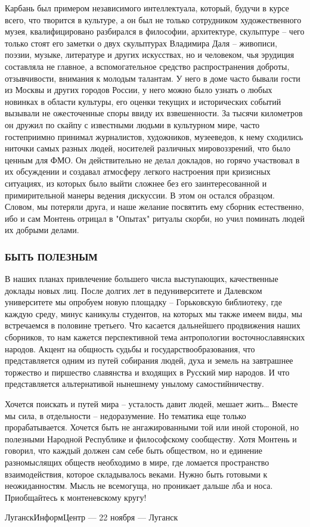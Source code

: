 Карбань был примером независимого интеллектуала, который, будучи в курсе всего,
что творится в культуре, а он был не только сотрудником художественного музея,
квалифицировано разбирался в философии, архитектуре, скульптуре – чего только
стоят его заметки о двух скульптурах Владимира Даля – живописи, поэзии, музыке,
литературе и других искусствах, но и человеком, чья эрудиция составляла не
главное, а вспомогательное средство распространения доброты, отзывчивости,
внимания к молодым талантам. У него в доме часто бывали гости из Москвы и
других городов России, у него можно было узнать о любых новинках в области
культуры, его оценки текущих и исторических событий вызывали не ожесточенные
споры ввиду их взвешенности. За тысячи километров он дружил по скайпу с
известными людьми в культурном мире, часто гостеприимно принимал журналистов,
художников, музееведов, к нему сходились ниточки самых разных людей, носителей
различных мировоззрений, что было ценным для ФМО. Он действительно не делал
докладов, но горячо участвовал в их обсуждении и создавал атмосферу легкого
настроения при кризисных ситуациях, из которых было выйти сложнее без его
заинтересованной и примирительной манеры ведения дискуссии. В этом он остался
образцом. Словом, мы потеряли друга, и наше желание посвятить ему сборник
естественно, ибо и сам Монтень отрицал в "Опытах" ритуалы скорби, но учил
поминать людей их добрыми делами.

\subsubsection{БЫТЬ ПОЛЕЗНЫМ}

В наших планах привлечение большего числа выступающих, качественные доклады
новых лиц. После долгих лет в педуниверситете и Далевском университете мы
опробуем новую площадку – Горьковскую библиотеку, где каждую среду, минус
каникулы студентов, на которых мы также имеем виды, мы встречаемся в половине
третьего. Что касается дальнейшего продвижения наших сборников, то нам кажется
перспективной тема антропологии восточнославянских народов. Акцент на общность
судьбы и государствообразования, что представляется одним из путей собирания
людей, духа и земель на завтрашнее торжество и пиршество славянства и входящих
в Русский мир народов. И что представляется альтернативой нынешнему унылому
самостийничеству.

Хочется поискать и путей мира – усталость давит людей, мешает жить… Вместе мы
сила, в отдельности – недоразумение. Но тематика еще только прорабатывается.
Хочется быть не ангажированными той или иной стороной, но полезными Народной
Республике и философскому сообществу. Хотя Монтень и говорил, что каждый должен
сам себе быть обществом, но и единение разномыслящих обществ необходимо в мире,
где ломается пространство взаимодействия, которое складывалось веками. Нужно
быть готовыми к неожиданностям. Мысль не всемогуща, но проникает дальше лба и
носа.  Приобщайтесь к монтеневскому кругу! 

ЛуганскИнформЦентр — 22 ноября — Луганск

